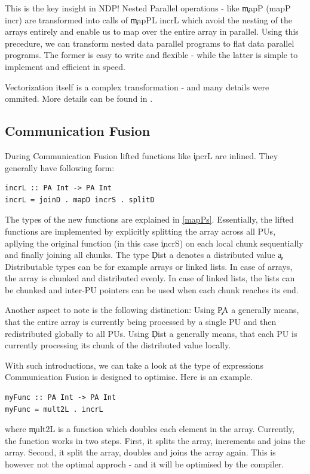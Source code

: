     This is the key insight in NDP! Nested Parallel operations - like \c{mapP (mapP incr)} are
    transformed into calls of \c{mapPL incrL} which avoid the nesting of
    the arrays entirely and enable us to map over the entire array in parallel.
    Using this precedure, we can transform nested data parallel programs
    to flat data parallel programs. The former is easy to write and flexible
    - while the latter is simple to implement and efficient in speed.
            
    Vectorization itself is a complex transformation - and many details were ommited.
    More details can be found in \cite{Harness2008}.
    
  \subsection{Communication Fusion}
    During Communication Fusion lifted functions like \c{incrL} are inlined.
    They generally have following form:
    \begin{lstlisting}
incrL :: PA Int -> PA Int
incrL = joinD . mapD incrS . splitD
    \end{lstlisting}
    The types of the new functions are explained in \ref{mapPs}.
    Essentially, the lifted functions are implemented by explicitly
    splitting the array across all PUs, apllying the original
    function (in this case \c{incrS}) on each local chunk sequentially and finally joining all chunks.
    The type \c{Dist a} denotes a distributed value \c{a}.
    Distributable types can be for example arrays or linked lists.
    In case of arrays, the array is chunked and distributed evenly.
    In case of linked lists, the lists can be chunked and
    inter-PU pointers can be used when each chunk reaches its end.
    
    Another aspect to note is the following distinction:
    Using \c{PA a} generally means, that the entire array
    is currently being processed by a single PU and
    then redistributed globally to all PUs.
    Using \c{Dist a} generally means,
    that each PU is currently processing its
    chunk of the distributed value locally.
    
    With such introductions, we can take a look at the type of expressions
    Communication Fusion is designed to optimise. Here is an example.
    \begin{lstlisting}
myFunc :: PA Int -> PA Int
myFunc = mult2L . incrL
    \end{lstlisting}
    where \c{mult2L} is a function which doubles each element in the array.
    Currently, the function works in two steps. First, it splits
    the array, increments and joins the array. Second, it split
    the array, doubles and joins the array again. This is however
    not the optimal approch - and it will be optimised by the compiler.
    
